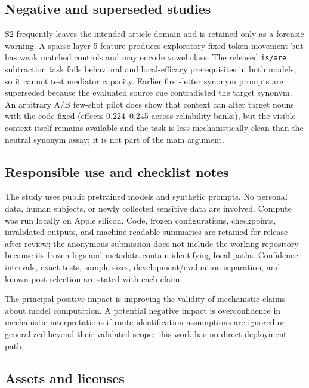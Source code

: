 \documentclass[
]{article}
\begin{document}
\subsection{Negative and superseded
studies}\label{negative-and-superseded-studies}

S2 frequently leaves the intended article domain and is retained only as
a forensic warning. A sparse layer-5 feature produces exploratory
fixed-token movement but has weak matched controls and may encode vowel
class. The released \texttt{is/are} subtraction task fails behavioral
and local-efficacy prerequisites in both models, so it cannot test
mediator capacity. Earlier first-letter synonym prompts are superseded
because the evaluated source cue contradicted the target synonym. An
arbitrary A/B few-shot pilot does show that context can alter target
nouns with the code fixed (effects 0.224--0.245 across reliability
banks), but the visible context itself remains available and the task is
less mechanistically clean than the neutral synonym assay; it is not
part of the main argument.

\subsection{Responsible use and checklist
notes}\label{responsible-use-and-checklist-notes}

The study uses public pretrained models and synthetic prompts. No
personal data, human subjects, or newly collected sensitive data are
involved. Compute was run locally on Apple silicon. Code, frozen
configurations, checkpoints, invalidated outputs, and machine-readable
summaries are retained for release after review; the anonymous
submission does not include the working repository because its frozen
logs and metadata contain identifying local paths. Confidence intervals,
exact tests, sample sizes, development/evaluation separation, and known
post-selection are stated with each claim.

The principal positive impact is improving the validity of mechanistic
claims about model computation. A potential negative impact is
overconfidence in mechanistic interpretations if route-identification
assumptions are ignored or generalized beyond their validated scope;
this work has no direct deployment path.

\subsection{Assets and licenses}\label{assets-and-licenses}
\end{document}
